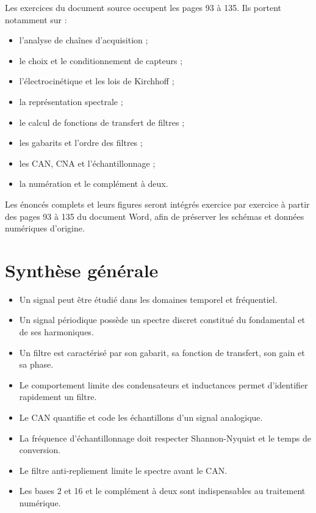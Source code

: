 Les exercices du document source occupent les pages 93 à 135. Ils portent notamment sur :
\begin{itemize}
  \item l'analyse de chaînes d'acquisition ;
  \item le choix et le conditionnement de capteurs ;
  \item l'électrocinétique et les lois de Kirchhoff ;
  \item la représentation spectrale ;
  \item le calcul de fonctions de transfert de filtres ;
  \item les gabarits et l'ordre des filtres ;
  \item les CAN, CNA et l'échantillonnage ;
  \item la numération et le complément à deux.
\end{itemize}

\begin{application}
Les énoncés complets et leurs figures seront intégrés exercice par exercice à partir des pages 93 à 135 du document Word, afin de préserver les schémas et données numériques d'origine.
\end{application}

\section{Synthèse générale}\label{sec:elec-synthese-generale}

\begin{itemize}
  \item Un signal peut être étudié dans les domaines temporel et fréquentiel.
  \item Un signal périodique possède un spectre discret constitué du fondamental et de ses harmoniques.
  \item Un filtre est caractérisé par son gabarit, sa fonction de transfert, son gain et sa phase.
  \item Le comportement limite des condensateurs et inductances permet d'identifier rapidement un filtre.
  \item Le CAN quantifie et code les échantillons d'un signal analogique.
  \item La fréquence d'échantillonnage doit respecter Shannon-Nyquist et le temps de conversion.
  \item Le filtre anti-repliement limite le spectre avant le CAN.
  \item Les bases 2 et 16 et le complément à deux sont indispensables au traitement numérique.
\end{itemize}
